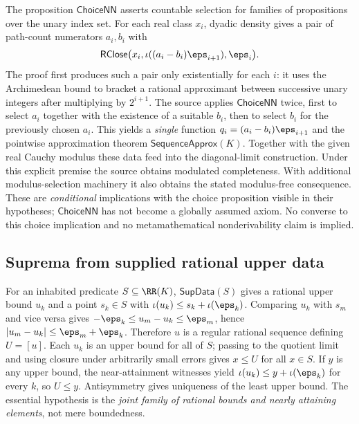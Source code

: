 The proposition $\mathsf{ChoiceNN}$ asserts countable selection for families of propositions over the unary index set. For each real class $x_i$, dyadic density gives a pair of path-count numerators $a_i,b_i$ with
\[
\mathsf{RClose}\bigl(x_i,\iota((a_i-b_i)\eps_{i+1}),\eps_i\bigr).
\]
The proof first produces such a pair only existentially for each $i$: it uses the Archimedean bound to bracket a rational approximant between successive unary integers after multiplying by $2^{i+1}$. The source applies $\mathsf{ChoiceNN}$ twice, first to select $a_i$ together with the existence of a suitable $b_i$, then to select $b_i$ for the previously chosen $a_i$. This yields a \emph{single} function $q_i=(a_i-b_i)\eps_{i+1}$ and the pointwise approximation theorem $\mathsf{SequenceApprox}(K)$. Together with the given real Cauchy modulus these data feed into the diagonal-limit construction. Under this explicit premise the source obtains modulated completeness. With additional modulus-selection machinery it also obtains the stated modulus-free consequence. These are \emph{conditional} implications with the choice proposition visible in their hypotheses; $\mathsf{ChoiceNN}$ has not become a globally assumed axiom. No converse to this choice implication and no metamathematical nonderivability claim is implied.

\subsection{Suprema from supplied rational upper data}\label{supp:13-6}
\par{}\par\smallskip

For an inhabited predicate $S\subseteq\RR(K)$, $\mathsf{SupData}(S)$ gives a rational upper bound $u_k$ and a point $s_k\in S$ with $\iota(u_k)\le s_k+\iota(\eps_k)$. Comparing $u_k$ with $s_m$ and vice versa gives $-\eps_k\le u_m-u_k\le\eps_m$, hence $|u_m-u_k|\le\eps_m+\eps_k$. Therefore $u$ is a regular rational sequence defining $U=[u]$. Each $u_k$ is an upper bound for all of $S$; passing to the quotient limit and using closure under arbitrarily small errors gives $x\le U$ for all $x\in S$. If $y$ is any upper bound, the near-attainment witnesses yield $\iota(u_k)\le y+\iota(\eps_k)$ for every $k$, so $U\le y$. Antisymmetry gives uniqueness of the least upper bound. The essential hypothesis is the \emph{joint family of rational bounds and nearly attaining elements}, not mere boundedness.

